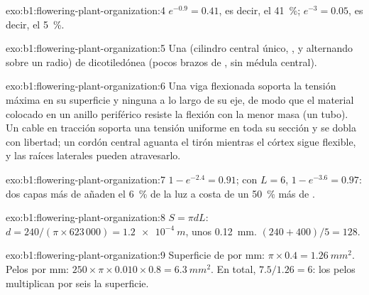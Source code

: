 \begin{solution}{exo:b1:flowering-plant-organization:4}
$e^{-0.9} = 0.41$, es decir, el \qty{41}{\%}; $e^{-3} = 0.05$, es decir, el
\qty{5}{\%}.
\end{solution}

\begin{solution}{exo:b1:flowering-plant-organization:5}
Una  (cilindro central único, ,  y  alternando
sobre un radio) de dicotiledónea (pocos brazos de , sin médula
central).
\end{solution}

\begin{solution}{exo:b1:flowering-plant-organization:6}
Una viga flexionada soporta la tensión máxima en su superficie y ninguna a
lo largo de su eje, de modo que el material colocado en un anillo periférico
resiste la flexión con la menor masa (un tubo). Un cable en tracción soporta
una tensión uniforme en toda su sección y se dobla con libertad; un cordón
central aguanta el tirón mientras el córtex sigue flexible, y las raíces
laterales pueden atravesarlo.
\end{solution}

\begin{solution}{exo:b1:flowering-plant-organization:7}
$1 - e^{-2.4} = 0.91$; con $L = 6$, $1 - e^{-3.6} = 0.97$: dos capas más de
 añaden el \qty{6}{\%} de la luz a costa de un \qty{50}{\%} más de
.
\end{solution}

\begin{solution}{exo:b1:flowering-plant-organization:8}
$S = \pi d L$: $d = 240/(\pi\times 623\,000) = \qty{1.2e-4}{m}$, unos
\qty{0.12}{mm}. $(240 + 400)/5 = 128$.
\end{solution}

\begin{solution}{exo:b1:flowering-plant-organization:9}
Superficie de  por mm: $\pi\times 0.4 = \qty{1.26}{mm^2}$. Pelos por mm:
$250\times\pi\times 0.010\times 0.8 = \qty{6.3}{mm^2}$. En total,
$7.5/1.26 = 6$: los pelos multiplican por seis la superficie.
\end{solution}

